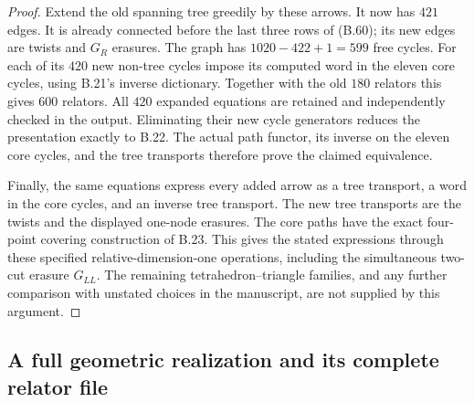 \begin{proof}
Extend the old spanning tree greedily by these arrows.
It now has $421$ edges.  It is already connected before
the last three rows of (B.60); its new edges are twists
and $G_R$ erasures.  The graph has
$1020-422+1=599$ free cycles.  For each of its $420$ new
non-tree cycles impose its computed word in the eleven
core cycles, using B.21's inverse dictionary.  Together
with the old $180$ relators this gives $600$ relators.
All $420$ expanded equations are retained and independently
checked in the output.  Eliminating their new cycle
generators reduces the presentation exactly to B.22.
The actual path functor, its inverse on the eleven core
cycles, and the tree transports therefore prove the
claimed equivalence.

Finally, the same equations express every added arrow
as a tree transport, a word in the core cycles, and an
inverse tree transport.  The new tree transports are
the twists and the displayed one-node erasures.  The
core paths have the exact four-point covering construction
of B.23.  This gives the stated expressions through
these specified relative-dimension-one operations,
including the simultaneous two-cut erasure $G_{LL}$.
The remaining tetrahedron--triangle families, and any
further comparison with unstated choices in the manuscript,
are not supplied by this argument.
\end{proof}


\subsection{A full geometric realization and its complete relator file}

